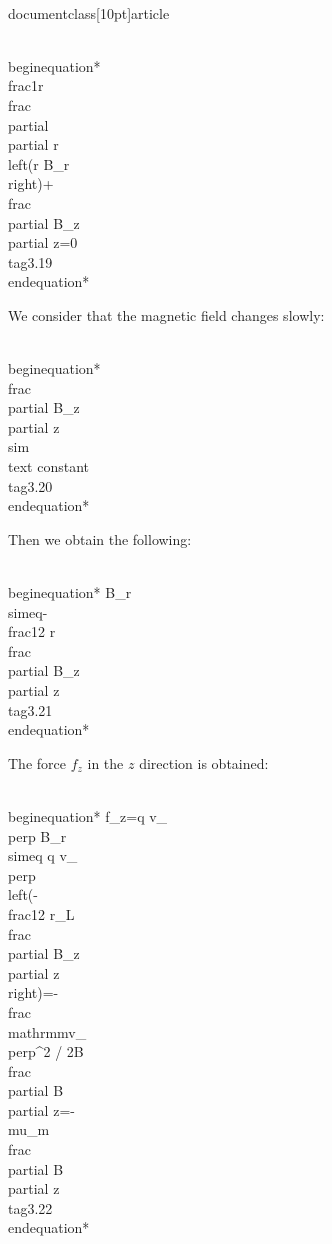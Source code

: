 \\documentclass[10pt]{article}
\begin{document}
\\begin{equation*}
\\frac{1}{r} \\frac{\\partial}{\\partial r}\\left(r B_{r}\\right)+\\frac{\\partial B_{z}}{\\partial z}=0 \\tag{3.19}
\\end{equation*}


We consider that the magnetic field changes slowly:


\\begin{equation*}
\\frac{\\partial B_{z}}{\\partial z} \\sim \\text { constant } \\tag{3.20}
\\end{equation*}


Then we obtain the following:


\\begin{equation*}
B_{r} \\simeq-\\frac{1}{2} r \\frac{\\partial B_{z}}{\\partial z} \\tag{3.21}
\\end{equation*}


The force $f_{z}$ in the $z$ direction is obtained:


\\begin{equation*}
f_{z}=q v_{\\perp} B_{r} \\simeq q v_{\\perp}\\left(-\\frac{1}{2} r_{L} \\frac{\\partial B_{z}}{\\partial z}\\right)=-\\frac{\\mathrm{mv}_{\\perp}^{2} / 2}{B} \\frac{\\partial B}{\\partial z}=-\\mu_{m} \\frac{\\partial B}{\\partial z} \\tag{3.22}
\\end{equation*}
\end{document}

